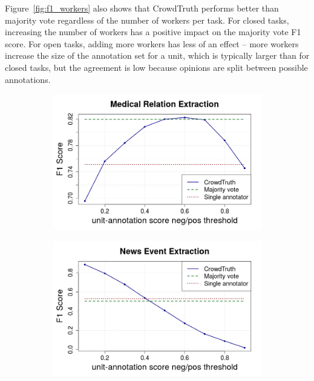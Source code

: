 Figure~\ref{fig:f1_workers} also shows that CrowdTruth performs better than majority vote regardless of the number of workers per task. For closed tasks, increasing the number of workers has a positive impact on the majority vote F1 score.  For open tasks, adding more workers has less of an effect -- more workers increase the size of the annotation set for a unit, which is typically larger than for closed tasks, but the agreement is low because opinions are split between possible annotations.

\begin{figure}[!tbh]
\centering
\begin{subfigure}{.5\textwidth}
\includegraphics[width=\linewidth]{img/exp_eval_relex.png}
\end{subfigure}%
\begin{subfigure}{.5\textwidth}
\end{subfigure}
\begin{subfigure}{.5\textwidth}
\includegraphics[width=\linewidth]{img/exp_eval_events.png}

\end{subfigure}
\end{figure}
